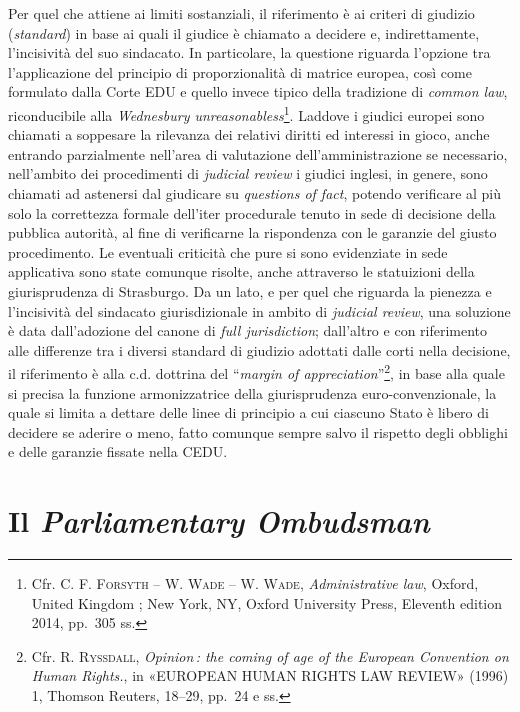 \documentclass[12pt,it,a4paper,]{report}
\begin{document}
Per quel che attiene ai limiti sostanziali, il riferimento è ai criteri
di giudizio (\emph{standard}) in base ai quali il giudice è chiamato a
decidere e, indirettamente, l'incisività del suo sindacato. In
particolare, la questione riguarda l'opzione tra l'applicazione del
principio di proporzionalità di matrice europea, così come formulato
dalla Corte EDU e quello invece tipico della tradizione di \emph{common
law}, riconducibile alla \emph{Wednesbury unreasonabless}\footnote{Cfr.
  C. F. \textsc{Forsyth} -- W. \textsc{Wade} -- W. \textsc{Wade},
  \emph{Administrative law}, Oxford, United Kingdom ; New York, NY,
  Oxford University Press, Eleventh edition 2014, pp.~305 ss.}. Laddove
i giudici europei sono chiamati a soppesare la rilevanza dei relativi
diritti ed interessi in gioco, anche entrando parzialmente nell'area di
valutazione dell'amministrazione se necessario, nell'ambito dei
procedimenti di \emph{judicial review} i giudici inglesi, in genere,
sono chiamati ad astenersi dal giudicare su \emph{questions of fact},
potendo verificare al più solo la correttezza formale dell'iter
procedurale tenuto in sede di decisione della pubblica autorità, al fine
di verificarne la rispondenza con le garanzie del giusto procedimento.
Le eventuali criticità che pure si sono evidenziate in sede applicativa
sono state comunque risolte, anche attraverso le statuizioni della
giurisprudenza di Strasburgo. Da un lato, e per quel che riguarda la
pienezza e l'incisività del sindacato giurisdizionale in ambito di
\emph{judicial review}, una soluzione è data dall'adozione del canone di
\emph{full jurisdiction}; dall'altro e con riferimento alle differenze
tra i diversi standard di giudizio adottati dalle corti nella decisione,
il riferimento è alla c.d. dottrina del ``\emph{margin of
appreciation}''\footnote{Cfr. R. \textsc{Ryssdall}, \emph{Opinion\,: the
  coming of age of the European Convention on Human Rights.}, in
  {«EUROPEAN HUMAN RIGHTS LAW REVIEW»} (1996) 1, Thomson Reuters,
  18--29, pp.~24 e ss.}, in base alla quale si precisa la funzione
armonizzatrice della giurisprudenza euro-convenzionale, la quale si
limita a dettare delle linee di principio a cui ciascuno Stato è libero
di decidere se aderire o meno, fatto comunque sempre salvo il rispetto
degli obblighi e delle garanzie fissate nella CEDU.

\hypertarget{il-parliamentary-ombudsman}{%
\section{\texorpdfstring{Il \emph{Parliamentary
Ombudsman}}{Il Parliamentary Ombudsman}}\label{il-parliamentary-ombudsman}}
\end{document}
